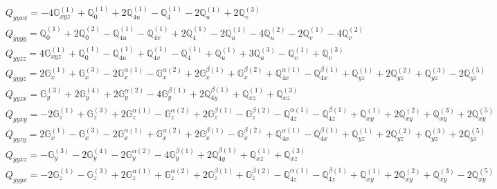 \documentclass[fleqn,8pt,landscape]{jsarticle}
\begin{document}
\begin{align*}
& Q_{yyxx} = - 4 \mathbb{G}_{xyz}^{(1)} + \mathbb{Q}_{0}^{(1)} + 2 \mathbb{Q}_{4u}^{(1)} - \mathbb{Q}_{4}^{(1)} - 2 \mathbb{Q}_{u}^{(1)} + 2 \mathbb{Q}_{v}^{(3)} \\
& Q_{yyyy} = \mathbb{Q}_{0}^{(1)} + 2 \mathbb{Q}_{0}^{(2)} - \mathbb{Q}_{4u}^{(1)} - \mathbb{Q}_{4v}^{(1)} + 2 \mathbb{Q}_{4}^{(1)} - 2 \mathbb{Q}_{u}^{(1)} - 4 \mathbb{Q}_{u}^{(2)} - 2 \mathbb{Q}_{v}^{(1)} - 4 \mathbb{Q}_{v}^{(2)} \\
& Q_{yyzz} = 4 \mathbb{G}_{xyz}^{(1)} + \mathbb{Q}_{0}^{(1)} - \mathbb{Q}_{4u}^{(1)} + \mathbb{Q}_{4v}^{(1)} - \mathbb{Q}_{4}^{(1)} + \mathbb{Q}_{u}^{(1)} + 3 \mathbb{Q}_{u}^{(3)} - \mathbb{Q}_{v}^{(1)} + \mathbb{Q}_{v}^{(3)} \\
& Q_{yyyz} = 2 \mathbb{G}_{x}^{(1)} + \mathbb{G}_{x}^{(3)} - 2 \mathbb{G}_{x}^{\alpha(1)} - \mathbb{G}_{x}^{\alpha(2)} + 2 \mathbb{G}_{x}^{\beta(1)} + \mathbb{G}_{x}^{\beta(2)} + \mathbb{Q}_{4x}^{\alpha(1)} - \mathbb{Q}_{4x}^{\beta(1)} + \mathbb{Q}_{yz}^{(1)} + 2 \mathbb{Q}_{yz}^{(2)} + \mathbb{Q}_{yz}^{(3)} - 2 \mathbb{Q}_{yz}^{(5)} \\
& Q_{yyzx} = \mathbb{G}_{y}^{(3)} + 2 \mathbb{G}_{y}^{(4)} + 2 \mathbb{G}_{y}^{\alpha(2)} - 4 \mathbb{G}_{y}^{\beta(1)} + 2 \mathbb{Q}_{4y}^{\beta(1)} + \mathbb{Q}_{xz}^{(1)} + \mathbb{Q}_{xz}^{(3)} \\
& Q_{yyxy} = - 2 \mathbb{G}_{z}^{(1)} + \mathbb{G}_{z}^{(3)} + 2 \mathbb{G}_{z}^{\alpha(1)} - \mathbb{G}_{z}^{\alpha(2)} + 2 \mathbb{G}_{z}^{\beta(1)} - \mathbb{G}_{z}^{\beta(2)} - \mathbb{Q}_{4z}^{\alpha(1)} - \mathbb{Q}_{4z}^{\beta(1)} + \mathbb{Q}_{xy}^{(1)} + 2 \mathbb{Q}_{xy}^{(2)} + \mathbb{Q}_{xy}^{(3)} + 2 \mathbb{Q}_{xy}^{(5)} \\
& Q_{yyzy} = 2 \mathbb{G}_{x}^{(1)} - \mathbb{G}_{x}^{(3)} - 2 \mathbb{G}_{x}^{\alpha(1)} + \mathbb{G}_{x}^{\alpha(2)} + 2 \mathbb{G}_{x}^{\beta(1)} - \mathbb{G}_{x}^{\beta(2)} + \mathbb{Q}_{4x}^{\alpha(1)} - \mathbb{Q}_{4x}^{\beta(1)} + \mathbb{Q}_{yz}^{(1)} + 2 \mathbb{Q}_{yz}^{(2)} + \mathbb{Q}_{yz}^{(3)} + 2 \mathbb{Q}_{yz}^{(5)} \\
& Q_{yyxz} = - \mathbb{G}_{y}^{(3)} - 2 \mathbb{G}_{y}^{(4)} - 2 \mathbb{G}_{y}^{\alpha(2)} - 4 \mathbb{G}_{y}^{\beta(1)} + 2 \mathbb{Q}_{4y}^{\beta(1)} + \mathbb{Q}_{xz}^{(1)} + \mathbb{Q}_{xz}^{(3)} \\
& Q_{yyyx} = - 2 \mathbb{G}_{z}^{(1)} - \mathbb{G}_{z}^{(3)} + 2 \mathbb{G}_{z}^{\alpha(1)} + \mathbb{G}_{z}^{\alpha(2)} + 2 \mathbb{G}_{z}^{\beta(1)} + \mathbb{G}_{z}^{\beta(2)} - \mathbb{Q}_{4z}^{\alpha(1)} - \mathbb{Q}_{4z}^{\beta(1)} + \mathbb{Q}_{xy}^{(1)} + 2 \mathbb{Q}_{xy}^{(2)} + \mathbb{Q}_{xy}^{(3)} - 2 \mathbb{Q}_{xy}^{(5)} \\

\end{align*}
\end{document}
